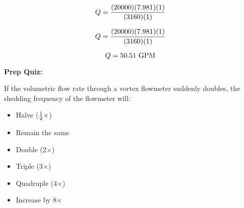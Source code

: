 $$Q = {(20000) (7.981) (1) \over (3160) (1)}$$

$$Q = {(20000) (7.981) (1) \over (3160) (1)}$$

$$Q = 50.51 \hbox{ GPM}$$
















\vfil \eject

\noindent
{\bf Prep Quiz:}

If the volumetric flow rate through a vortex flowmeter suddenly doubles, the shedding frequency of the flowmeter will:

\begin{itemize}
\item{} Halve (${1 \over 2} \times$) 
\vskip 5pt 
\item{} Remain the same
\vskip 5pt 
\item{} Double (2$\times$)
\vskip 5pt 
\item{} Triple (3$\times$)
\vskip 5pt 
\item{} Quadruple (4$\times$)
\vskip 5pt 
\item{} Increase by 8$\times$ 
\end{itemize}




